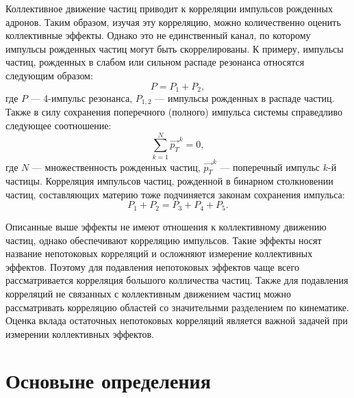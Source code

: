 Коллективное движение частиц приводит к корреляции импульсов рожденных адронов.
Таким образом, изучая эту корреляцию, можно количественно оценить коллективные эффекты.
Однако это не единственный канал, по которому импульсы рожденных частиц могут быть скоррелированы.
К примеру, импульсы частиц, рожденных в слабом или сильном распаде резонанса относятся следующим образом:
%
\begin{equation}
    P = P_1 + P_2,
\end{equation}
где $P$ --- 4-импульс резонанса, $P_{1,2}$ --- импульсы рожденных в распаде частиц.
Также в силу сохранения поперечного (полного) импульса системы справедливо следующее соотношение:
%
\begin{equation}
    \sum_{k=1}^{N} \vec{p_T}^k = 0,
\end{equation}
где $N$ --- множественность рожденных частиц, $\vec{p_{T}}^k$ --- поперечный импульс $k$-й частицы.
Корреляция импульсов частиц, рожденной в бинарном столкновении частиц, составляющих материю тоже подчиняется законам сохранения импульса:
%
\begin{equation}
    P_1 + P_2 = P_3 + P_4 + P_5.
\end{equation}

Описанные выше эффекты не имеют отношения к коллективному движению частиц, однако обеспечивают корреляцию импульсов.
Такие эффекты носят название непотоковых корреляций и осложняют измерение коллективных эффектов.
Поэтому для подавления непотоковых эффектов чаще всего рассматривается корреляция большого колличества частиц.
Также для подавления корреляций не связанных с коллективным движением частиц можно рассматривать корреляцию областей со значительнми разделением по кинематике.
Оценка вклада остаточных непотоковых корреляций является важной задачей при измерении коллективных эффектов.

\section{Основыне определения}

